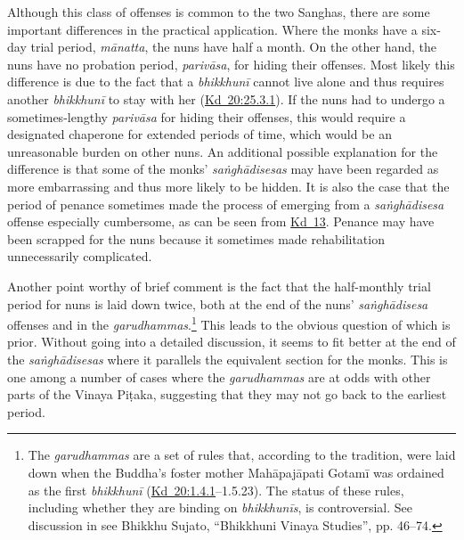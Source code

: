 \documentclass[12pt,openany]{book}%
\begin{document}
Although this class of offenses is common to the two Sanghas, there are some important differences in the practical application. Where the monks have a six-day trial period, \textit{\textsanskrit{mānatta}}, the nuns have half a month. On the other hand, the nuns have no probation period, \textit{\textsanskrit{parivāsa}}, for hiding their offenses. Most likely this difference is due to the fact that a \textit{\textsanskrit{bhikkhunī}} cannot live alone and thus requires another \textit{\textsanskrit{bhikkhunī}} to stay with her (\href{https://suttacentral.net/pli-tv-kd20/en/brahmali\#25.3.1}{Kd~20:25.3.1}). If the nuns had to undergo a sometimes-lengthy \textit{\textsanskrit{parivāsa}} for hiding their offenses, this would require a designated chaperone for extended periods of time, which would be an unreasonable burden on other nuns. An additional possible explanation for the difference is that some of the monks’ \textit{\textsanskrit{saṅghādisesas}} may have been regarded as more embarrassing and thus more likely to be hidden. It is also the case that the period of penance sometimes made the process of emerging from a \textit{\textsanskrit{saṅghādisesa}} offense especially cumbersome, as can be seen from \href{https://suttacentral.net/pli-tv-kd13/en/brahmali}{Kd~13}. Penance may have been scrapped for the nuns because it sometimes made rehabilitation unnecessarily complicated.

Another point worthy of brief comment is the fact that the half-monthly trial period for nuns is laid down twice, both at the end of the nuns’ \textit{\textsanskrit{saṅghādisesa}} offenses and in the \textit{garudhammas}.\footnote{The \textit{garudhammas} are a set of rules that, according to the tradition, were laid down when the Buddha’s foster mother \textsanskrit{Mahāpajāpati} \textsanskrit{Gotamī} was ordained as the first \textit{\textsanskrit{bhikkhunī}} (\href{https://suttacentral.net/pli-tv-kd20/en/brahmali\#1.4.1}{Kd~20:1.4.1}–1.5.23). The status of these rules, including whether they are binding on \textit{\textsanskrit{bhikkhunīs}}, is controversial. See discussion in see Bhikkhu Sujato, “Bhikkhuni Vinaya Studies”, pp. 46–74. } This leads to the obvious question of which is prior. Without going into a detailed discussion, it seems to fit better at the end of the \textit{\textsanskrit{saṅghādisesas}} where it parallels the equivalent section for the monks. This is one among a number of cases where the \textit{garudhammas} are at odds with other parts of the Vinaya \textsanskrit{Piṭaka}, suggesting that they may not go back to the earliest period.
\end{document}
